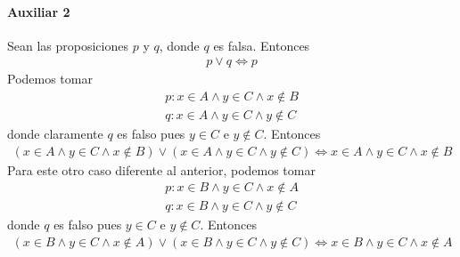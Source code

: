 \begin{enumerate}[label=\roman*)]
  \paragraph{Auxiliar 2}{
    Sean las proposiciones $p$ y $q$, donde $q$ es falsa. Entonces 
    \begin{align*}
      p \lor q \iff p
    \end{align*}
    Podemos tomar
    \begin{align*}
      p: x \in A \land y \in C \land x \notin B \\
      q: x \in A \land y \in C \land y \notin C
    \end{align*}
    donde claramente $q$ es falso pues $y \in C$ e $y \notin C$. Entonces
    \begin{align*}
      (x \in A \land y \in C \land x \notin B) \lor (x \in A \land y \in C \land y \notin C)
      \iff x \in A \land y \in C \land x \notin B
    \end{align*}
    Para este otro caso diferente al anterior, podemos tomar
    \begin{align*}
      p: x \in B \land y \in C \land x \notin A \\
      q: x \in B \land y \in C \land y \notin C
    \end{align*}
    donde $q$ es falso pues $y \in C$ e $y \notin C$. Entonces
    \begin{align*}
      (x \in B \land y \in C \land x \notin A) \lor (x \in B \land y \in C \land y \notin C)
      \iff x \in B \land y \in C \land x \notin A
    \end{align*}
  }
\end{enumerate}


\begin{aportes}
  \item {}
  \item {}
\end{aportes}
